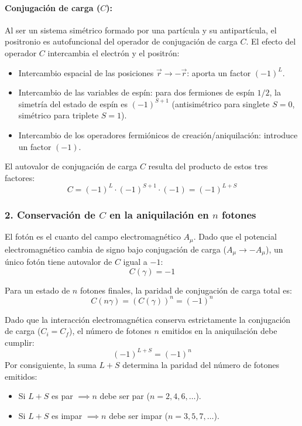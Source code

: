 \begin{problema}
\paragraph{Conjugación de carga ($C$):}
Al ser un sistema simétrico formado por una partícula y su antipartícula, el positronio es autofuncional del operador de conjugación de carga $C$. El efecto del operador $C$ intercambia el electrón y el positrón:
\begin{itemize}
    \item Intercambio espacial de las posiciones $\vec{r} \to -\vec{r}$: aporta un factor $(-1)^L$.
    \item Intercambio de las variables de espín: para dos fermiones de espín $1/2$, la simetría del estado de espín es $(-1)^{S+1}$ (antisimétrico para singlete $S=0$, simétrico para triplete $S=1$).
    \item Intercambio de los operadores fermiónicos de creación/aniquilación: introduce un factor $(-1)$.
\end{itemize}

El autovalor de conjugación de carga $C$ resulta del producto de estos tres factores:
\begin{equation*}
C = (-1)^L \cdot (-1)^{S+1} \cdot (-1) = (-1)^{L+S}
\end{equation*}

\subsubsection*{2. Conservación de $C$ en la aniquilación en $n$ fotones}

El fotón es el cuanto del campo electromagnético $A_\mu$. Dado que el potencial electromagnético cambia de signo bajo conjugación de carga ($A_\mu \to -A_\mu$), un único fotón tiene autovalor de $C$ igual a $-1$:
\begin{equation*}
C(\gamma) = -1
\end{equation*}

Para un estado de $n$ fotones finales, la paridad de conjugación de carga total es:
\begin{equation*}
C(n\gamma) = \left( C(\gamma) \right)^n = (-1)^n
\end{equation*}

Dado que la interacción electromagnética conserva estrictamente la conjugación de carga ($C_i = C_f$), el número de fotones $n$ emitidos en la aniquilación debe cumplir:
\begin{equation*}
(-1)^{L+S} = (-1)^n
\end{equation*}
Por consiguiente, la suma $L+S$ determina la paridad del número de fotones emitidos:
\begin{itemize}
    \item Si $L+S$ es par $\implies n$ debe ser par ($n = 2, 4, 6, \dots$).
    \item Si $L+S$ es impar $\implies n$ debe ser impar ($n = 3, 5, 7, \dots$).
\end{itemize}


\end{problema}
